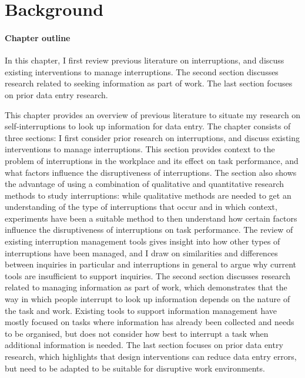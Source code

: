 \chapter{Background}\label{ch:Background}

\begin{mynote}
\subsubsection{Chapter outline}
In this chapter, I first review previous literature on interruptions, and discuss existing interventions to manage interruptions. The second section discusses research related to seeking information as part of work. The last section focuses on prior data entry research. 
\end{mynote}

This chapter provides an overview of previous literature to situate my research on self-interruptions to look up information for data entry. The chapter consists of three sections: I first consider prior research on interruptions, and discuss existing interventions to manage interruptions. This section provides context to the problem of interruptions in the workplace and its effect on task performance, and what factors influence the disruptiveness of interruptions. The section also shows the advantage of using a combination of qualitative and quantitative research methods to study interruptions: while qualitative methods are needed to get an understanding of the type of interruptions that occur and in which context, experiments have been a suitable method to then understand how certain factors influence the disruptiveness of interruptions on task performance. The review of existing interruption management tools gives insight into how other types of interruptions have been managed, and I draw on similarities and differences between inquiries in particular and interruptions in general to argue why current tools are insufficient to support inquiries. The second section discusses research related to managing information as part of work, which demonstrates that the way in which people interrupt to look up information depends on the nature of the task and work. Existing tools to support information management have mostly focused on tasks where information has already been collected and needs to be organised, but does not consider how best to interrupt a task when additional information is needed. The last section focuses on prior data entry research, which highlights that design interventions can reduce data entry errors, but need to be adapted to be suitable for disruptive work environments. 

